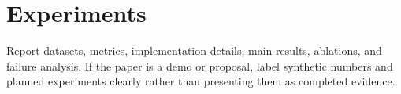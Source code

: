 \section{Experiments}

Report datasets, metrics, implementation details, main results, ablations, and failure analysis. If the paper is a demo or proposal, label synthetic numbers and planned experiments clearly rather than presenting them as completed evidence.
